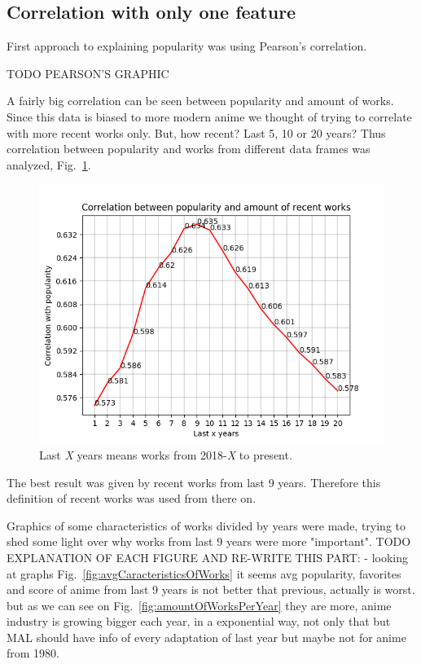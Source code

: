 \subsection{Correlation with only one feature}
First approach to explaining popularity was using Pearson’s correlation. 

TODO PEARSON'S GRAPHIC

A fairly big correlation can be seen between popularity and amount of works. Since this data is biased to more modern anime we thought of trying to correlate with more recent works only. But, how recent? Last 5, 10 or 20 years? Thus correlation between popularity and works from different data frames was analyzed, Fig.~\ref{fig:correlationPopRecentWorks}.

\begin{figure}[!hbt]
	\begin{center}
	\includegraphics[width=\columnwidth]{graphics/correlationPopRecentWorks.png}
	\caption{Last \textit{X} years means works from 2018-\textit{X} to present.}
	\label{fig:correlationPopRecentWorks}
	\end{center}
\end{figure}

The best result was given by recent works from last 9 years. Therefore this definition of recent works was used from there on.

Graphics of some characteristics of works divided by years were made, trying to shed some light over why works from last 9 years were more "important". TODO EXPLANATION OF EACH FIGURE AND RE-WRITE THIS PART: 
- looking at graphs Fig.~\ref{fig:avgCaracteristicsOfWorks} it seems avg popularity, favorites and score of anime from last 9 years is not better that previous, actually is worst. but as we can see on Fig.~\ref{fig:amountOfWorksPerYear} they are more, anime industry is growing bigger each year, in a exponential way, not only that but MAL should have info of every adaptation of last year but maybe not for anime from 1980.

